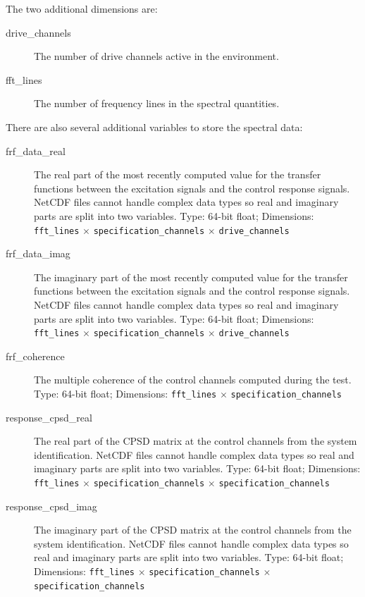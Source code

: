 \documentclass[pdf,12pt,report]{SANDreport}
\newcommand{\inlineCode}{\lstinline[basicstyle=\bfseries\ttfamily]}
\begin{document}
    The two additional dimensions are:
    
    \begin{description}
        \item[drive\_channels] The number of drive channels active in the environment.
        \item[fft\_lines] The number of frequency lines in the spectral quantities.
    \end{description}
    
    There are also several additional variables to store the spectral data:
    
    \begin{description}
        \item[frf\_data\_real] The real part of the most recently computed value for the transfer functions between the excitation signals and the control response signals.  NetCDF files cannot handle complex data types so real and imaginary parts are split into two variables.  Type: 64-bit float; Dimensions: \inlineCode{fft_lines} $\times$ \inlineCode{specification_channels} $\times$ \inlineCode{drive_channels}
        
        \item[frf\_data\_imag] The imaginary part of the most recently computed value for the transfer functions between the excitation signals and the control response signals.  NetCDF files cannot handle complex data types so real and imaginary parts are split into two variables.  Type: 64-bit float; Dimensions: \inlineCode{fft_lines} $\times$ \inlineCode{specification_channels} $\times$ \inlineCode{drive_channels}
        
        \item[frf\_coherence] The multiple coherence of the control channels computed during the test.  Type: 64-bit float; Dimensions: \inlineCode{fft_lines} $\times$ \inlineCode{specification_channels}
        
        \item[response\_cpsd\_real] The real part of the \ac{CPSD} matrix at the control channels from the system identification.  NetCDF files cannot handle complex data types so real and imaginary parts are split into two variables.  Type: 64-bit float; Dimensions: \inlineCode{fft_lines} $\times$ \inlineCode{specification_channels} $\times$ \inlineCode{specification_channels}
        
        \item[response\_cpsd\_imag] The imaginary part of the \ac{CPSD} matrix at the control channels from the system identification.  NetCDF files cannot handle complex data types so real and imaginary parts are split into two variables.  Type: 64-bit float; Dimensions: \inlineCode{fft_lines} $\times$ \inlineCode{specification_channels} $\times$ \inlineCode{specification_channels}
        

\end{description}
\end{document}
